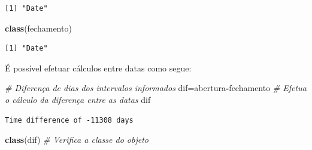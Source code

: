 \documentclass[12pt,brazil,oneside]{book}
\newenvironment{Shaded}{\begin{snugshade}}{\end{snugshade}}
\newcommand{\CommentTok}[1]{\textcolor[rgb]{0.56,0.35,0.01}{\textit{#1}}}
\newcommand{\DataTypeTok}[1]{\textcolor[rgb]{0.13,0.29,0.53}{#1}}
\newcommand{\KeywordTok}[1]{\textcolor[rgb]{0.13,0.29,0.53}{\textbf{#1}}}
\newcommand{\NormalTok}[1]{#1}
\newcommand{\OperatorTok}[1]{\textcolor[rgb]{0.81,0.36,0.00}{\textbf{#1}}}
\newcommand{\StringTok}[1]{\textcolor[rgb]{0.31,0.60,0.02}{#1}}
\begin{document}
\begin{Shaded}
\end{Shaded}

\begin{verbatim}
[1] "Date"
\end{verbatim}

\begin{Shaded}
\begin{Highlighting}[]
\KeywordTok{class}\NormalTok{(fechamento)}
\end{Highlighting}
\end{Shaded}

\begin{verbatim}
[1] "Date"
\end{verbatim}

É possível efetuar cálculos entre datas como segue:

\begin{Shaded}
\begin{Highlighting}[]
\CommentTok{# Diferença de dias dos intervalos informados}
\NormalTok{dif=abertura}\OperatorTok{-}\NormalTok{fechamento }\CommentTok{# Efetua o cálculo da diferença entre as datas}
\NormalTok{dif}
\end{Highlighting}
\end{Shaded}

\begin{verbatim}
Time difference of -11308 days
\end{verbatim}

\begin{Shaded}
\begin{Highlighting}[]
\KeywordTok{class}\NormalTok{(dif) }\CommentTok{# Verifica a classe do objeto}
\end{Highlighting}
\end{Shaded}
\end{document}

